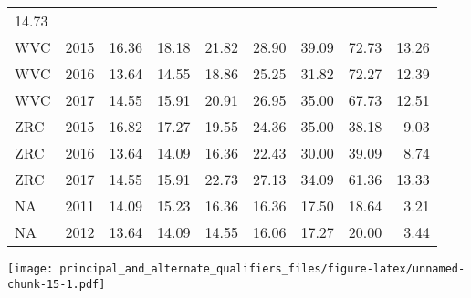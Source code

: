 \documentclass[]{article}
\begin{document}
\begin{longtable}[]{@{}lrrrrrrrr@{}}
14.73\tabularnewline
WVC & 2015 & 16.36 & 18.18 & 21.82 & 28.90 & 39.09 & 72.73 &
13.26\tabularnewline
WVC & 2016 & 13.64 & 14.55 & 18.86 & 25.25 & 31.82 & 72.27 &
12.39\tabularnewline
WVC & 2017 & 14.55 & 15.91 & 20.91 & 26.95 & 35.00 & 67.73 &
12.51\tabularnewline
ZRC & 2015 & 16.82 & 17.27 & 19.55 & 24.36 & 35.00 & 38.18 &
9.03\tabularnewline
ZRC & 2016 & 13.64 & 14.09 & 16.36 & 22.43 & 30.00 & 39.09 &
8.74\tabularnewline
ZRC & 2017 & 14.55 & 15.91 & 22.73 & 27.13 & 34.09 & 61.36 &
13.33\tabularnewline
NA & 2011 & 14.09 & 15.23 & 16.36 & 16.36 & 17.50 & 18.64 &
3.21\tabularnewline
NA & 2012 & 13.64 & 14.09 & 14.55 & 16.06 & 17.27 & 20.00 &
3.44\tabularnewline
\bottomrule
\end{longtable}

\texttt{[image: principal\_and\_alternate\_qualifiers\_files/figure-latex/unnamed-chunk-15-1.pdf]}
\end{document}

